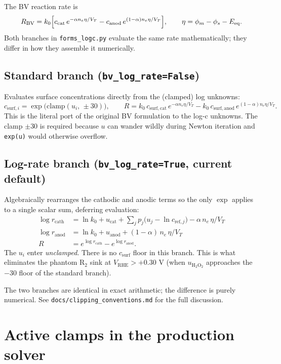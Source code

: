 \documentclass[11pt]{article}
\newcommand{\Eeq}{E_{\mathrm{eq}}}
\begin{document}
The BV reaction rate is
\[
  R_{\mathrm{BV}}
  = k_0\Bigl[c_{\mathrm{cat}}\,e^{-\alpha n_e \eta/V_T}
            - c_{\mathrm{anod}}\,e^{(1-\alpha)n_e \eta/V_T}\Bigr],
  \qquad
  \eta = \phi_m - \phi_s - \Eeq.
\]
Both branches in \verb|forms_logc.py| evaluate the same rate
mathematically; they differ in how they assemble it numerically.

\subsection{Standard branch (\texttt{bv\_log\_rate=False})}
Evaluates surface concentrations directly from the (clamped) log unknowns:
\[
  c_{\mathrm{surf},i} = \exp\!\bigl(\mathrm{clamp}(u_i,\,\pm 30)\bigr),
  \qquad
  R = k_0\,c_{\mathrm{surf,cat}}\,e^{-\alpha n_e\eta/V_T}
        - k_0\,c_{\mathrm{surf,anod}}\,e^{(1-\alpha)n_e\eta/V_T}.
\]
This is the literal port of the original BV formulation to the log-c
unknowns. The clamp $\pm 30$ is required because $u$ can wander wildly
during Newton iteration and \texttt{exp(u)} would otherwise overflow.

\subsection{Log-rate branch (\texttt{bv\_log\_rate=True}, current default)}
Algebraically rearranges the cathodic and anodic terms so the only $\exp$
applies to a single scalar sum, deferring evaluation:
\begin{align*}
  \log r_{\mathrm{cath}} &= \ln k_0 + u_{\mathrm{cat}}
       + \sum_{j} p_j\bigl(u_j - \ln c_{\mathrm{ref},j}\bigr)
       - \alpha\,n_e\,\eta/V_T \\
  \log r_{\mathrm{anod}} &= \ln k_0 + u_{\mathrm{anod}}
       + (1-\alpha)\,n_e\,\eta/V_T \\
  R &= e^{\log r_{\mathrm{cath}}} - e^{\log r_{\mathrm{anod}}}.
\end{align*}
The $u_i$ enter \emph{unclamped}. There is no $c_{\mathrm{surf}}$ floor in
this branch. This is what eliminates the phantom $\mathrm{R}_2$ sink at
$V_{\mathrm{RHE}} > +0.30$ V (when $u_{\mathrm{H_2O_2}}$ approaches the
$-30$ floor of the standard branch).

The two branches are identical in exact arithmetic; the difference is
purely numerical. See \texttt{docs/clipping\_conventions.md} for the full
discussion.

\section{Active clamps in the production solver}
\end{document}
